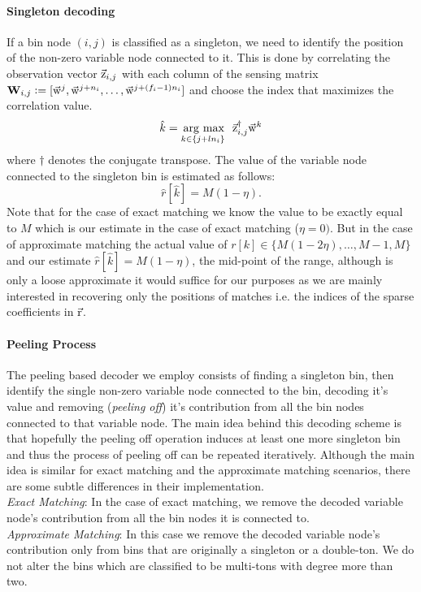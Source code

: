 \paragraph*{Singleton decoding}
 If a bin node $(i,j)$ is classified as a singleton, we need to identify the position of the non-zero variable node connected to it. This is done by correlating the observation vector $\vec{\mathrm{z}}_{i,j}$ with each column of the sensing matrix  $\mathbf{W}_{i,j} \mathrel{\mathop:}= [\vec{\mathrm{w}}^{j},\vec{\mathrm{w}}^{j+n_i},\ldots,   \vec{\mathrm{w}}^{j+(f_i-1)n_i}]$ and choose the index that maximizes the correlation value.
\begin{align*}
 \hat{k} = \underset{k\in\{j+l n_i\}}{\operatorname*{\,arg\ max}}~~ \vec{\mathrm{z}}^{\dagger}_{i,j} \vec{\mathrm{w}}^{k}
\end{align*}
where $\dagger$ denotes the conjugate transpose. The value of the variable node connected to the singleton bin is estimated as follows:
 $$
 \hat{r}[\hat{k}]=M(1-\eta).
 $$
 Note that for the case of exact matching we know the value to be exactly equal to $M$ which is our estimate in the case of exact matching ($\eta=0)$. But in the case of approximate matching the actual value of $r[k]\in\{M(1-2\eta),\ldots,M-1,M\}$ and our estimate $ \hat{r}[\hat{k}]=M(1-\eta)$, the mid-point of the range, although is only a loose approximate it would suffice for our purposes as we are mainly interested in recovering only the positions of matches i.e. the indices of the sparse coefficients in $\vec{\mathrm{r}}$.			 
\paragraph*{Peeling Process} The peeling based decoder we employ consists of finding a singleton bin, then identify the single non-zero variable node connected to the bin, decoding it's value and removing ({\it peeling off}) it's contribution from all the bin nodes connected to that variable node. The main idea behind this decoding scheme is that hopefully the peeling off operation induces at least one more singleton bin and thus the process of peeling off can be repeated iteratively. Although the main idea is similar for exact matching and the approximate matching scenarios, there are some subtle differences in their implementation.\\
{\it Exact Matching}: In the case of exact matching, we remove the decoded variable node's contribution from all the bin nodes it is connected to.\\
{\it Approximate Matching}: In this case we remove the decoded variable node's contribution only from bins that are originally a singleton or a double-ton. We do not alter the bins which are classified to be multi-tons with degree more than two.   

